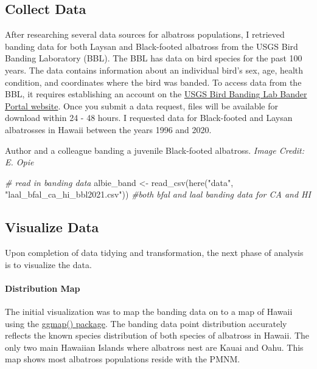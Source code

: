 \documentclass[
]{article}
\newenvironment{Shaded}{\begin{snugshade}}{\end{snugshade}}
\newcommand{\CommentTok}[1]{\textcolor[rgb]{0.56,0.35,0.01}{\textit{#1}}}
\newcommand{\FunctionTok}[1]{\textcolor[rgb]{0.00,0.00,0.00}{#1}}
\newcommand{\NormalTok}[1]{#1}
\newcommand{\OtherTok}[1]{\textcolor[rgb]{0.56,0.35,0.01}{#1}}
\newcommand{\StringTok}[1]{\textcolor[rgb]{0.31,0.60,0.02}{#1}}
\begin{document}
\hypertarget{collect-data}{%
\subsection{Collect Data}\label{collect-data}}

After researching several data sources for albatross populations, I
retrieved banding data for both Laysan and Black-footed albatross from
the USGS Bird Banding Laboratory (BBL). The BBL has data on bird species
for the past 100 years. The data contains information about an
individual bird's sex, age, health condition, and coordinates where the
bird was banded. To access data from the BBL, it requires establishing
an account on the
\href{https://www.pwrc.usgs.gov/bbl/Bander_portal/login/main_login.php}{USGS
Bird Banding Lab Bander Portal website}. Once you submit a data request,
files will be available for download within 24 - 48 hours. I requested
data for Black-footed and Laysan albatrosses in Hawaii between the years
1996 and 2020.

Author and a colleague banding a juvenile Black-footed albatross.
\emph{Image Credit: E. Opie}

\begin{Shaded}
\begin{Highlighting}[]
\CommentTok{\# read in banding data}
\NormalTok{albie\_band }\OtherTok{\textless{}{-}} \FunctionTok{read\_csv}\NormalTok{(}\FunctionTok{here}\NormalTok{(}\StringTok{"data"}\NormalTok{, }\StringTok{"laal\_bfal\_ca\_hi\_bbl2021.csv"}\NormalTok{)) }\CommentTok{\#both bfal and laal banding data for CA and HI}
\end{Highlighting}
\end{Shaded}

\hypertarget{visualize-data}{%
\subsection{Visualize Data}\label{visualize-data}}

Upon completion of data tidying and transformation, the next phase of
analysis is to visualize the data.

\hypertarget{distribution-map}{%
\paragraph{Distribution Map}\label{distribution-map}}

The initial visualization was to map the banding data on to a map of
Hawaii using the
\href{https://cran.r-project.org/web/packages/ggmap/readme/README.html}{ggmap()
package}. The banding data point distribution accurately reflects the
known species distribution of both species of albatross in Hawaii. The
only two main Hawaiian Islands where albatross nest are Kauai and Oahu.
This map shows most albatross populations reside with the PMNM.
\end{document}

